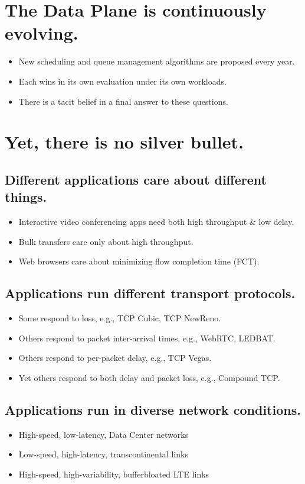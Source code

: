 {\large \bf
\begin{multicols}{2}
\section*{The Data Plane is continuously evolving.}
\begin{itemize}
\item New scheduling and queue management algorithms are proposed every year.
\item Each wins in its own evaluation under its own workloads.
\item There is a tacit belief in a final answer to these questions.
\end{itemize}

\section*{Yet, there is no silver bullet.}
\subsection*{Different applications care about different things.}
\begin{itemize}
\item Interactive video conferencing apps need both high throughput \& low delay.
\item Bulk transfers care only about high throughput.
\item Web browsers care about minimizing flow completion time (FCT).
\end{itemize}

\subsection*{Applications run different transport protocols.}
\begin{itemize}
\item Some respond to loss, e.g., TCP Cubic, TCP NewReno.
\item Others respond to packet inter-arrival times, e.g., WebRTC, LEDBAT.
\item Others respond to per-packet delay, e.g., TCP Vegas.
\item Yet others respond to both delay and packet loss, e.g., Compound TCP.
\end{itemize}

\subsection*{Applications run in diverse network conditions.}
\begin{itemize}
\item High-speed, low-latency, Data Center networks
\item Low-speed, high-latency, transcontinental links
\item High-speed, high-variability, bufferbloated LTE links
\end{itemize}


\end{multicols}}
